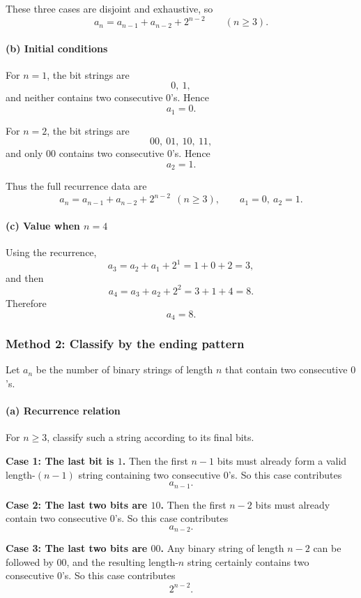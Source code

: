 \documentclass[12pt]{article}
\begin{document}
These three cases are disjoint and exhaustive, so
\[
\boxed{a_n=a_{n-1}+a_{n-2}+2^{n-2}\qquad (n\ge 3).}
\]

\paragraph{(b) Initial conditions}
For \(n=1\), the bit strings are
\[
0,\ 1,
\]
and neither contains two consecutive \(0\)'s. Hence
\[
\boxed{a_1=0.}
\]

For \(n=2\), the bit strings are
\[
00,\ 01,\ 10,\ 11,
\]
and only \(00\) contains two consecutive \(0\)'s. Hence
\[
\boxed{a_2=1.}
\]

Thus the full recurrence data are
\[
\boxed{a_n=a_{n-1}+a_{n-2}+2^{n-2}\ \ (n\ge 3),\qquad a_1=0,\ a_2=1.}
\]

\paragraph{(c) Value when \(n=4\)}
Using the recurrence,
\[
a_3=a_2+a_1+2^{1}=1+0+2=3,
\]
and then
\[
a_4=a_3+a_2+2^{2}=3+1+4=8.
\]
Therefore
\[
\boxed{a_4=8.}
\]

\newpage
\subsubsection*{Method 2: Classify by the ending pattern}

Let \(a_n\) be the number of binary strings of length \(n\) that contain two consecutive \(0\)'s.

\paragraph{(a) Recurrence relation}
For \(n\ge 3\), classify such a string according to its final bits.

\medskip
\noindent
\textbf{Case 1: The last bit is \(1\).}  
Then the first \(n-1\) bits must already form a valid length-\((n-1)\) string containing two consecutive \(0\)'s.  
So this case contributes
\[
a_{n-1}.
\]

\medskip
\noindent
\textbf{Case 2: The last two bits are \(10\).}  
Then the first \(n-2\) bits must already contain two consecutive \(0\)'s.  
So this case contributes
\[
a_{n-2}.
\]

\medskip
\noindent
\textbf{Case 3: The last two bits are \(00\).}  
Any binary string of length \(n-2\) can be followed by \(00\), and the resulting length-\(n\) string certainly contains two consecutive \(0\)'s.  
So this case contributes
\[
2^{n-2}.
\]
\end{document}
